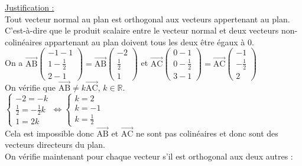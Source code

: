 \documentclass[a4paper, 12pt]{article}
\begin{document}
\noindent
\underline{Justification :}
\\
Tout vecteur normal au plan est orthogonal aux vecteurs appertenant au plan. 
C'est-à-dire que le produit scalaire entre le vecteur normal et deux vecteurs non-colinéaires appartenant au plan doivent tous les deux être égaux à 0.
\\
On a $\overrightarrow{\text{AB}}\begin{pmatrix}-1-1\\1-\frac{1}{2} \\ 2-1\end{pmatrix} = \overrightarrow{\text{AB}}\begin{pmatrix} -2 \\ \frac{1}{2} \\ 1\end{pmatrix}$ et 
$\overrightarrow{\text{AC}}\begin{pmatrix} 0-1 \\ 0- \frac{1}{2} \\ 3-1 \end{pmatrix} = \overrightarrow{\text{AC}}\begin{pmatrix} -1 \\ -\frac{1}{2} \\ 2 \end{pmatrix}$
\\[2mm]
On vérifie que $\overrightarrow{\text{AB}} \neq k\overrightarrow{\text{AC}}$, $k \in \mathbb{R}$.
\\[2mm]
$\begin{cases} -2 = -k \\ \frac{1}{2} = -\frac{1}{2}k \\ 1 = 2k \end{cases} \iff \begin{cases}k = 2 \\ k = -1 \\ k = \frac{1}{2} \end{cases}$ 
\\[2mm]
Cela est impossible donc $\overrightarrow{\text{AB}}$ et $\overrightarrow{\text{AC}}$ ne sont pas colinéaires et donc sont des vecteurs directeurs du plan. 
\\
On vérifie maintenant pour chaque vecteur s'il est orthogonal aux deux autres :
\vspace{3mm}
\end{document}
